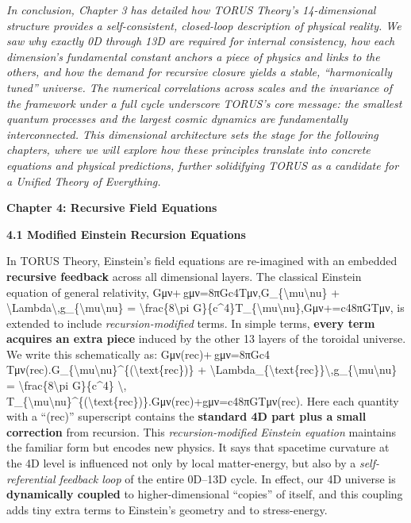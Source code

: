 \documentclass[
]{article}
\begin{document}
{\emph{In conclusion, Chapter 3 has detailed how TORUS Theory's
14-dimensional structure provides a self-consistent, closed-loop
description of physical reality. We saw why exactly 0D through 13D are
required for internal consistency, how each dimension's fundamental
constant anchors a piece of physics and links to the others, and how the
demand for recursive closure yields a stable, ``harmonically tuned''
universe. The numerical correlations across scales and the invariance of
the framework under a full cycle underscore TORUS's core message: the
smallest quantum processes and the largest cosmic dynamics are
fundamentally interconnected. This dimensional architecture sets the
stage for the following chapters, where we will explore how these
principles translate into concrete equations and physical predictions,
further solidifying TORUS as a candidate for a Unified Theory of
Everything.}

\textbf{Chapter 4: Recursive Field Equations}

\textbf{4.1 Modified Einstein Recursion Equations}

In TORUS Theory, Einstein's field equations are re-imagined with an
embedded \textbf{recursive feedback} across all dimensional layers. The
classical Einstein equation of general relativity,
Gμν+\Lambda gμν=8πGc4Tμν,G\_\{\textbackslash mu\textbackslash nu\} +
\textbackslash Lambda\textbackslash,g\_\{\textbackslash mu\textbackslash nu\}
= \textbackslash frac\{8\textbackslash pi
G\}\{c\^{}4\}T\_\{\textbackslash mu\textbackslash nu\},Gμν\hspace{0pt}+\hspace{0pt}=c48πG\hspace{0pt}Tμν\hspace{0pt},
is extended to include \emph{recursion-modified} terms. In simple terms,
\textbf{every term acquires an extra piece} induced by the other 13
layers of the toroidal universe. We write this schematically as:
Gμν(rec)+\Lambdarec gμν=8πGc4 Tμν(rec).G\_\{\textbackslash mu\textbackslash nu\}\^{}\{(\textbackslash text\{rec\})\}
+
\textbackslash Lambda\_\{\textbackslash text\{rec\}\}\textbackslash,g\_\{\textbackslash mu\textbackslash nu\}
= \textbackslash frac\{8\textbackslash pi G\}\{c\^{}4\} \textbackslash,
T\_\{\textbackslash mu\textbackslash nu\}\^{}\{(\textbackslash text\{rec\})\}.Gμν(rec)\hspace{0pt}+\Lambdarec\hspace{0pt}gμν\hspace{0pt}=c48πG\hspace{0pt}Tμν(rec)\hspace{0pt}.
Here each quantity with a ``(rec)'' superscript contains the
\textbf{standard 4D part plus a small correction} from recursion. This
\emph{recursion-modified Einstein equation} maintains the familiar form
but encodes new physics. It says that spacetime curvature at the 4D
level is influenced not only by local matter-energy, but also by a
\emph{self-referential feedback loop} of the entire 0D--13D
cycle\hspace{0pt}. In effect, our 4D universe is \textbf{dynamically
coupled} to higher-dimensional ``copies'' of itself, and this coupling
adds tiny extra terms to Einstein's geometry and to stress-energy.

}
\end{document}
